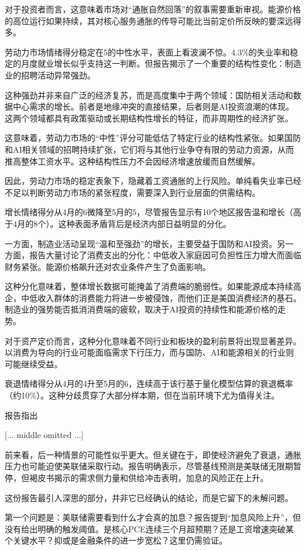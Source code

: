 \documentclass[11pt]{ctexart}
\begin{document}
对于投资者而言，这意味着市场对“通胀自然回落”的叙事需要重新审视。能源价格的高位运行如果持续，其对核心服务通胀的传导可能比当前定价所反映的要深远得多。

劳动力市场情绪得分稳定在5的中性水平，表面上看波澜不惊。4.3\%的失业率和稳定的月度就业增长似乎支持这一判断。但报告揭示了一个重要的结构性变化：制造业的招聘活动异常强劲。

这种强劲并非来自广泛的经济复苏，而是高度集中于两个领域：国防相关活动和数据中心需求的增长。前者是地缘冲突的直接结果，后者则是AI投资浪潮的体现。这两个领域都具有政策驱动或长期结构性增长的特征，而非周期性的经济扩张。

这意味着，劳动力市场的“中性”评分可能低估了特定行业的结构性紧张。如果国防和AI相关领域的招聘持续扩张，它们将与其他行业争夺有限的劳动力资源，从而推高整体工资水平。这种结构性压力不会因经济增速放缓而自然缓解。

因此，劳动力市场的稳定表象下，隐藏着工资通胀的上行风险。单纯看失业率已经不足以判断劳动力市场的紧张程度，需要深入到行业层面的供需结构。

增长情绪得分从4月的6微降至5月的5，尽管报告显示有10个地区报告温和增长（高于4月的8个）。这种表面矛盾背后是经济内部日益明显的分化。

一方面，制造业活动呈现“温和至强劲”的增长，主要受益于国防和AI投资。另一方面，报告大量讨论了消费支出的分化：中低收入家庭因可负担性压力增大而面临财务紧张。能源价格飙升还对农业条件产生了负面影响。

这种分化意味着，整体增长数据可能掩盖了消费端的脆弱性。如果能源成本持续高企，中低收入群体的消费能力将进一步被侵蚀，而他们正是美国消费经济的基石。制造业的强势能否抵消消费端的疲软，取决于AI投资的持续性和能源价格的走势。

对于资产定价而言，这种分化意味着不同行业和板块的盈利前景将出现显著差异。以消费为导向的行业可能面临需求下行压力，而与国防、AI和能源相关的行业则可能继续受益。

衰退情绪得分从4月的4升至5月的6，连续高于该行基于量化模型估算的衰退概率（约10\%）。这种分歧贯穿了大部分样本期，但在当前环境下尤为值得关注。

报告指出

[... middle omitted ...]

前来看，后一种情景的可能性似乎更大。但关键在于，即使经济避免了衰退，通胀压力也可能迫使美联储采取行动。报告明确表示，尽管基线预测是美联储无限期暂停，但褐皮书揭示的需求侧力量和供给冲击表明，加息的风险正在上升。

这份报告最引人深思的部分，并非它已经确认的结论，而是它留下的未解问题。

第一个问题是：美联储需要看到什么才会真的加息？报告提到“加息风险上升”，但没有给出明确的触发阈值。是核心PCE连续三个月超预期？还是工资增速突破某个关键水平？抑或是金融条件的进一步宽松？这里仍需验证。
\end{document}
